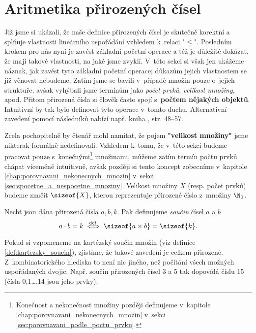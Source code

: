 \section{Aritmetika přirozených čísel}\label{sec:aritmetika_prirozenych_cisel}
Již jsme si ukázali, že naše definice přirozených čísel je skutečně korektní a splňuje vlastnosti lineárního uspořádání vzhledem k~relaci "$\leq$". Posledním krokem pro nás nyní je zavést základní početní operace a též je důležité dokázat, že mají takové vlastnosti, na jaké jsme zvyklí. V~této sekci si však jen ukážeme náznak, jak zavést tyto základní početní operace; důkazům jejich vlastnostem se již věnovat nebudeme. Zatím jsme se bavili v~případě množin pouze o~jejich struktuře, avšak vyhýbali jsme termínům jako \emph{počet prvků}, \emph{velikost množiny}, apod. Přitom přirozená čísla si člověk často spojí s~\textbf{počtem nějakých objektů}. Intuitivní by tak bylo definovat tyto operace v~tomto duchu. Alternativní zavedení pomocí následníků nabízí např. kniha \cite{Goldrei2017}, str. 48--57.\par
Zcela pochopitelně by čtenář mohl namítat, že pojem \textbf{"velikost množiny"} jsme nikterak formálně nedefinovali. Vzhledem k~tomu, že v~této sekci budeme pracovat pouze s~konečnými\footnote{Konečnost a nekonečnost množiny později definujeme v~kapitole \ref{chap:porovnavani_nekonecnych_mnozin} v~sekci \ref{sec:porovnavani_podle_poctu_prvku}.} množinami, můžeme zatím termín počtu prvků chápat víceméně intuitivně, avšak později si tento koncept zobecníme v~kapitole \ref{chap:porovnavani_nekonecnych_mnozin} v~sekci \ref{sec:spocetne_a_nespocetne_mnoziny}. Velikost množiny $X$ (resp. počet prvků) budeme značit $\sizeof{X}$, kterou reprezentuje přirozené číslo z~množiny $\N_0$.\par
\begin{definition}\label{def:soucin_pritozenych_cisel}
    Nechť jsou dána přirozená čísla $a,b,k$. Pak definujeme \emph{součin} čísel $a$ a $b$
    \begin{equation*}
        a\cdot b=k\stackrel{\text{def.}}{\iff} \sizeof{a\times b}=\sizeof{k}.
    \end{equation*}
\end{definition}
Pokud si vzpomeneme na kartézský součin množin (viz definice \ref{def:kartezsky_soucin}), zjistíme, že takové zavedení je celkem přirozené. Z~kombinatorického hlediska to není nic jiného, než počítání všech možných uspořádaných dvojic. Např. součin přirozených čísel 3 a 5 tak dopovídá číslu 15 (čísla 0,1\dots,14 jsou jeho prvky).\par
